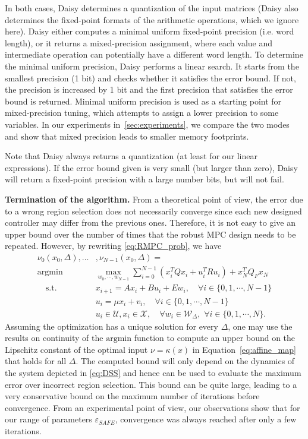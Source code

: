 In both cases, Daisy determines a quantization of the input matrices (Daisy also
determines the fixed-point formats of the arithmetic operations, which we ignore here).
Daisy either computes a minimal uniform fixed-point precision (i.e. word length),
or it returns a mixed-precision assignment, where each value and
intermediate operation can potentially have a different word length.
To determine the minimal uniform precision, Daisy performs a linear search.
It starts from the smallest precision (1 bit) and checks whether it satisfies the
error bound. If not, the precision is increased by 1 bit and the first precision
that satisfies the error bound is returned.
Minimal uniform precision is used as a starting point for mixed-precision tuning,
which attempts to assign a lower precision to some variables. 
In our experiments in~\autoref{sec:experiments}, we compare the two modes and show
that mixed precision leads to smaller memory footprints.

Note that Daisy always returns a quantization (at least for our linear
expressions). If the error bound given is very small (but larger than zero),
Daisy will return a fixed-point precision with a large number bits, but will not
fail.

\smallskip
\noindent
\textbf{Termination of the algorithm.}
From a theoretical point of view, the error due to a wrong region selection does not necessarily converge since each new designed controller may differ from the previous ones. Therefore, it is not easy to give an upper bound over the number of times that the robust MPC design needs to be repeated. However, by rewriting \autoref{eq:RMPC_prob}, we have
\begin{align*}
\nu_0(x_0, \Delta),\ldots&,\nu_{N-1}(x_0,\Delta)=\\
\mathrm{argmin} & \max_{w_0,\cdots,w_{N-1}} \sum_{i=0}^{N-1}(x_i^TQx_i+u_i^TRu_i) + x_N^TQ_Fx_N\nonumber\\
\quad  \text{s.t.} \quad & x_{i+1}=Ax_i+Bu_i + E w_i, \quad\forall i\in\{0,1,\cdots,N-1\}\nonumber\\
\quad \quad & u_i=\mu x_i+v_i, \quad\forall i\in\{0,1,\cdots,N-1\}\nonumber\\
\quad \quad & u_i\in\mathcal{U},x_i\in\mathcal{X},\quad \forall w_i\in\mathcal{W}_{\Delta},\,\,\forall i\in\{0,1,\cdots,N\}.
\end{align*}
Assuming the optimization has a unique solution for every $\Delta$, 
one may use the results on continuity of the $\mathrm{argmin}$ function to compute an upper bound on the 
Lipschitz constant of the optimal input $\nu = \kappa(x)$ in Equation~\eqref{eq:affine_map} that holds for all $\Delta$. 
The computed bound will only depend on the dynamics of the system depicted in \autoref{eq:DSS} and hence can be used 
to evaluate the maximum error over incorrect region selection. 
This bound can be quite large, leading to a very conservative bound on the maximum number of iterations before convergence. 
From an experimental point of view, our observations show that for our range of parameters $\varepsilon_{\mathit{SAFE}}$, convergence was
always reached after only a few iterations.

